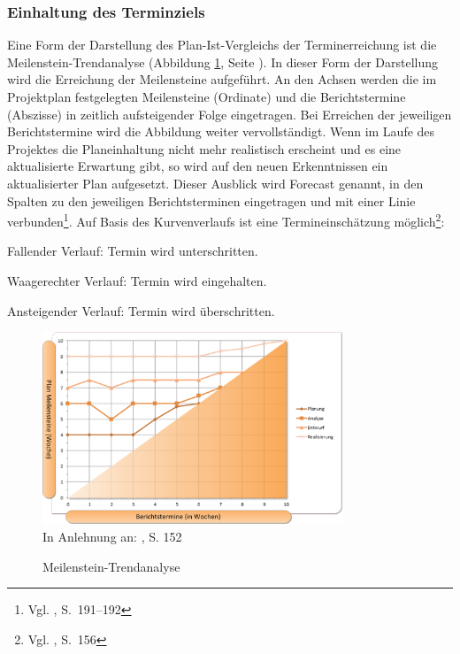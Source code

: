 \subsubsection{Einhaltung des Terminziels}
Eine Form der Darstellung des Plan-Ist-Vergleichs der Terminerreichung ist die Meilenstein-Trendanalyse (Abbildung \ref{abb9}, Seite \pageref{abb9}). In dieser Form der Darstellung wird die Erreichung der Meilensteine aufgeführt. An den Achsen werden die im Projektplan festgelegten Meilensteine (Ordinate) und die Berichtstermine (Abszisse) in zeitlich aufsteigender Folge eingetragen. Bei Erreichen der jeweiligen Berichtstermine wird die Abbildung weiter vervollständigt. Wenn im Laufe des Projektes die Planeinhaltung nicht mehr realistisch erscheint und es eine aktualisierte Erwartung gibt, so wird auf den neuen Erkenntnissen ein aktualisierter Plan aufgesetzt. Dieser Ausblick wird Forecast  genannt, in den Spalten zu den jeweiligen Berichtsterminen eingetragen und mit einer Linie verbunden\footnote{Vgl. \cite{Wegmann&Winklbauer2006}, S.~191--192}. Auf Basis des Kurvenverlaufs ist eine Termineinschätzung möglich\footnote{Vgl. \cite{Litke2007}, S.~156}:
\begin{compactitem}
\item Fallender Verlauf: Termin wird unterschritten.
\item Waagerechter Verlauf: Termin wird eingehalten.
\item Ansteigender Verlauf: Termin wird überschritten.
\end{compactitem}

\begin{figure}[htbp]
\begin{center}
\includegraphics[width=0.8\textwidth]{Images/trendAnalyse.png}\\{\footnotesize In Anlehnung an: \cite{Blazek2001}, S. 152}
\caption[Meilenstein-Trendanalyse]{Meilenstein-Trendanalyse}\label{abb9}
\end{center}
\end{figure}

